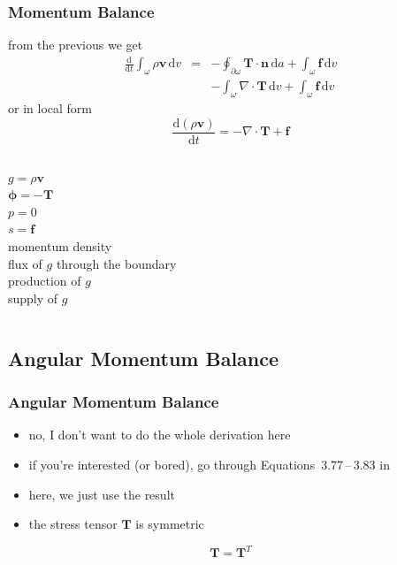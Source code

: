 \documentclass[hide notes,intlimits]{beamer}
\begin{document}
\begin{frame}
  \frametitle{Momentum Balance}
  from the previous we get
  \begin{eqnarray}
    \frac{\text{d}}{\text{d} t} \int_{\omega} \rho \mathbf{v}\, \text{d} v & = & - \oint_{\partial \omega} \mathbf{T} \cdot \mathbf{n} \, \text{d} a + \int_{\omega} \mathbf{f} \, \text{d} v \\
    & & -\int_{\omega} \nabla \cdot \mathbf{T}\, \text{d} v + \int_{\omega} \mathbf{f} \, \text{d} v
  \end{eqnarray} or in local form
  \begin{equation}
    \frac{\text{d}\left(\rho\mathbf{v}\right)}{\text{d} t} = -\nabla \cdot \mathbf{T} + \mathbf{f}
  \end{equation}
  \begin{columns}
    \column[C]{2cm}
    $g = \rho \mathbf{v}$ \\
    $\boldsymbol{\phi} = - \mathbf{T} $ \\
    $p = 0$ \\
    $s = \mathbf{f}$ \\
    \column[C]{6cm}
      momentum density \\
      flux of $g$ through the boundary \\
      production of $g$ \\
      supply of $g$
    \end{columns}
\end{frame}


\subsection{Angular Momentum Balance}

\begin{frame}
  \frametitle{Angular Momentum Balance}
  \begin{itemize}
  \item  no, I don't want to do the whole derivation here
  \item if you're interested (or bored), go through Equations~3.77\,--\,3.83  in \cite{GreveBlatter_disg}
  \item here, we just use the result
  \item the stress tensor $\mathbf{T}$ is \alert{symmetric}
  \end{itemize}
  \begin{equation}
    \mathbf{T} = \mathbf{T}^{T}
 \end{equation}
\end{frame}
\end{document}
